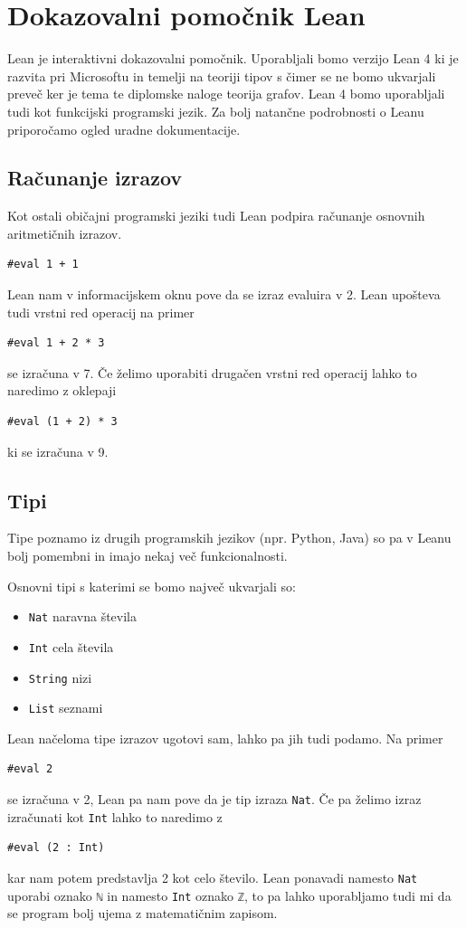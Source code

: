 \documentclass[mat1]{fmfdelo}
\begin{document}
\section{Dokazovalni pomočnik Lean}
Lean je interaktivni dokazovalni pomočnik. Uporabljali bomo verzijo Lean 4 ki je razvita pri Microsoftu in temelji na teoriji tipov
s čimer se ne bomo ukvarjali preveč ker je tema te diplomske naloge teorija grafov. Lean 4 bomo uporabljali tudi
kot funkcijski programski jezik. Za bolj natančne podrobnosti o Leanu priporočamo ogled uradne dokumentacije. 

\subsection{Računanje izrazov}
Kot ostali običajni programski jeziki tudi Lean podpira računanje osnovnih aritmetičnih izrazov.
\begin{lstlisting}
#eval 1 + 1
\end{lstlisting}
Lean nam v informacijskem oknu pove da se izraz evaluira v 2. Lean upošteva tudi vrstni red operacij na primer
\begin{lstlisting}
#eval 1 + 2 * 3
\end{lstlisting}
se izračuna v 7. Če želimo uporabiti drugačen vrstni red operacij lahko to naredimo z oklepaji
\begin{lstlisting}
#eval (1 + 2) * 3
\end{lstlisting}
ki se izračuna v 9.


\subsection{Tipi}
Tipe poznamo iz drugih programskih jezikov (npr. Python, Java) so pa v Leanu bolj pomembni in imajo nekaj več funkcionalnosti.

Osnovni tipi s katerimi se bomo največ ukvarjali so:
\begin{itemize}
    \item \lstinline{Nat} naravna števila
    \item \lstinline{Int} cela števila
    \item \lstinline{String} nizi
    \item \lstinline{List} seznami
\end{itemize}
Lean načeloma tipe izrazov ugotovi sam, lahko pa jih tudi podamo. Na primer
\begin{lstlisting}
#eval 2
\end{lstlisting}
se izračuna v 2, Lean pa nam pove da je tip izraza \lstinline{Nat}. Če pa želimo izraz izračunati kot \lstinline{Int} lahko to naredimo z
\begin{lstlisting}
#eval (2 : Int)
\end{lstlisting}
kar nam potem predstavlja 2 kot celo število. Lean ponavadi namesto
\lstinline{Nat} uporabi oznako \lstinline{ℕ} in namesto \lstinline{Int} oznako \lstinline{ℤ}, to pa lahko uporabljamo tudi mi
da se program bolj ujema z matematičnim zapisom. 
\end{document}

